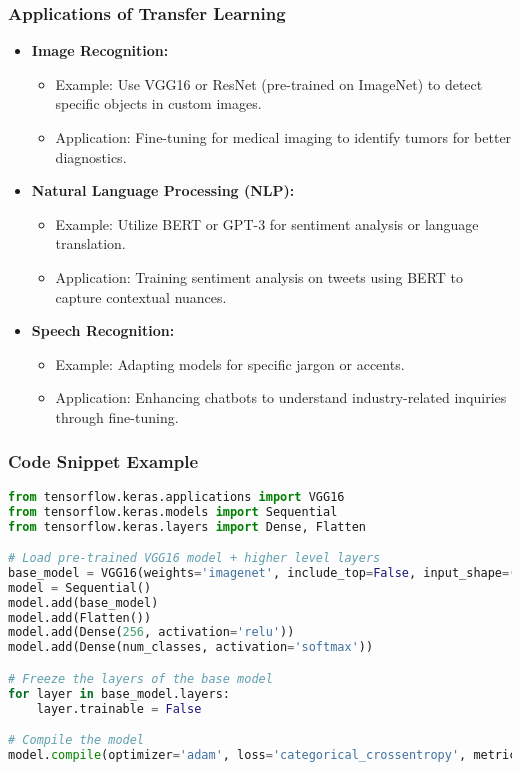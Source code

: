 \documentclass[aspectratio=169]{beamer}
\begin{document}
\begin{frame}[fragile]
    \frametitle{Applications of Transfer Learning}
    \begin{itemize}
        \item \textbf{Image Recognition:}
        \begin{itemize}
            \item Example: Use VGG16 or ResNet (pre-trained on ImageNet) to detect specific objects in custom images.
            \item Application: Fine-tuning for medical imaging to identify tumors for better diagnostics.
        \end{itemize}

        \item \textbf{Natural Language Processing (NLP):}
        \begin{itemize}
            \item Example: Utilize BERT or GPT-3 for sentiment analysis or language translation.
            \item Application: Training sentiment analysis on tweets using BERT to capture contextual nuances.
        \end{itemize}
        
        \item \textbf{Speech Recognition:}
        \begin{itemize}
            \item Example: Adapting models for specific jargon or accents.
            \item Application: Enhancing chatbots to understand industry-related inquiries through fine-tuning.
        \end{itemize}
    \end{itemize}
\end{frame}

\begin{frame}[fragile]
    \frametitle{Code Snippet Example}
    \begin{lstlisting}[language=Python]
from tensorflow.keras.applications import VGG16
from tensorflow.keras.models import Sequential
from tensorflow.keras.layers import Dense, Flatten

# Load pre-trained VGG16 model + higher level layers
base_model = VGG16(weights='imagenet', include_top=False, input_shape=(224, 224, 3))
model = Sequential()
model.add(base_model)
model.add(Flatten())
model.add(Dense(256, activation='relu'))
model.add(Dense(num_classes, activation='softmax'))

# Freeze the layers of the base model
for layer in base_model.layers:
    layer.trainable = False

# Compile the model
model.compile(optimizer='adam', loss='categorical_crossentropy', metrics=['accuracy'])
    \end{lstlisting}
\end{frame}
\end{document}
